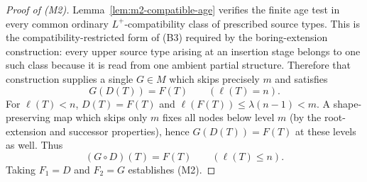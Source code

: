 \begin{proof}[Proof of (M2)]
Lemma~\ref{lem:m2-compatible-age} verifies the finite age test in
every common ordinary $L^+$-compatibility class of prescribed source
types.  This is the compatibility-restricted form of (B3) required
by the boring-extension construction: every upper source type
arising at an insertion stage belongs to one such class because it
is read from one ambient partial structure.  Therefore that
construction supplies a single $G\in M$ which skips precisely $m$
and satisfies
\[
       G(D(T))=F(T)\qquad (\ell(T)=n).
\]
For $\ell(T)<n$, $D(T)=F(T)$ and
$\ell(F(T))\leq\lambda(n-1)<m$.  A shape-preserving map which skips
only $m$ fixes all nodes below level $m$ (by the root-extension and
successor properties), hence $G(D(T))=F(T)$ at these levels as well.
Thus
\[
       (G\circ D)(T)=F(T)\qquad (\ell(T)\leq n).
\]
Taking $F_1=D$ and $F_2=G$ establishes (M2).
\end{proof}

